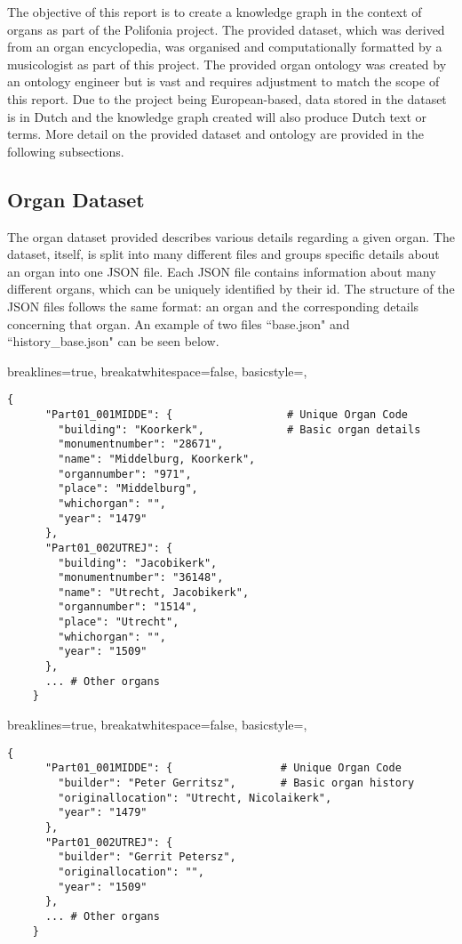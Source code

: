 The objective of this report is to create a knowledge graph in the context of organs as part of the Polifonia project. The provided dataset, which was derived from an organ encyclopedia, was organised and computationally formatted by a musicologist as part of this project. The provided organ ontology \cite{organontology} was created by an ontology engineer but is vast and requires adjustment to match the scope of this report. Due to the project being European-based, data stored in the dataset is in Dutch and the knowledge graph created will also produce Dutch text or terms. More detail on the provided dataset and ontology are provided in the following subsections.  

\subsection{Organ Dataset}
\hspace{0.5cm} The organ dataset provided describes various details regarding a given organ. The dataset, itself, is split into many different files and groups specific details about an organ into one JSON file. Each JSON file contains information about many different organs, which can be uniquely identified by their id. The structure of the JSON files follows the same format: an organ and the corresponding details concerning that organ. An example of two files ``base.json" and ``history\_base.json" can be seen below. 

\lstset
{
    breaklines=true,
    breakatwhitespace=false,
    basicstyle=\linespread{1.25}\ttfamily,
}
\begin{lstlisting}[caption=base.json extract]
    {
      "Part01_001MIDDE": {                  # Unique Organ Code
        "building": "Koorkerk",             # Basic organ details
        "monumentnumber": "28671",
        "name": "Middelburg, Koorkerk",
        "organnumber": "971",
        "place": "Middelburg",
        "whichorgan": "",
        "year": "1479"
      },
      "Part01_002UTREJ": {
        "building": "Jacobikerk",
        "monumentnumber": "36148",
        "name": "Utrecht, Jacobikerk",
        "organnumber": "1514",
        "place": "Utrecht",
        "whichorgan": "",
        "year": "1509"
      },
      ... # Other organs
    }
\end{lstlisting}

\lstset
{
    breaklines=true,
    breakatwhitespace=false,
    basicstyle=\linespread{1.25}\ttfamily,
}
\begin{lstlisting}[caption=history\_base.json extract]
    {
      "Part01_001MIDDE": {                 # Unique Organ Code
        "builder": "Peter Gerritsz",       # Basic organ history
        "originallocation": "Utrecht, Nicolaikerk",
        "year": "1479"
      },
      "Part01_002UTREJ": {
        "builder": "Gerrit Petersz",
        "originallocation": "",
        "year": "1509"
      },
      ... # Other organs
    }
\end{lstlisting}

